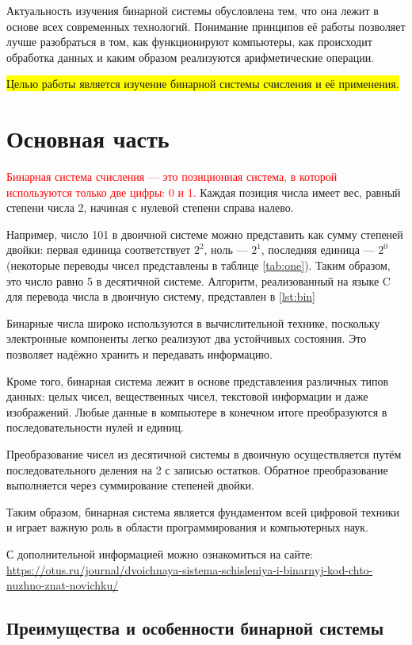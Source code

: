 \documentclass[a4paper, 12pt]{report}
\begin{document}
	Актуальность изучения бинарной системы обусловлена тем, что она лежит в основе всех современных технологий. 
	Понимание принципов её работы позволяет лучше разобраться в том, как функционируют компьютеры, как 
	происходит обработка данных и каким образом реализуются арифметические операции.
	
	\colorbox{yellow}{Целью работы является изучение бинарной системы счисления и её применения.}
	
	\chapter{Основная часть}
	\textcolor{red}{Бинарная система счисления — это позиционная система, в которой используются только две цифры: 0 и 1.}
	Каждая позиция числа имеет вес, равный степени числа 2, начиная с нулевой степени справа налево.
	
	Например, число 101 в двоичной системе можно представить как сумму степеней двойки:
	первая единица соответствует $2^2$, ноль — $2^1$, последняя единица — $2^0$ (некоторые переводы чисел представлены в таблице \ref{tab:one}).
	Таким образом, это число равно 5 в десятичной системе. Алгоритм, реализованный на языке C для перевода числа в двоичную систему, представлен в \ref{lst:bin} 
	
	Бинарные числа широко используются в вычислительной технике, поскольку электронные компоненты 
	легко реализуют два устойчивых состояния. Это позволяет надёжно хранить и передавать информацию.
	
	Кроме того, бинарная система лежит в основе представления различных типов данных: целых чисел, 
	вещественных чисел, текстовой информации и даже изображений. Любые данные в компьютере в конечном 
	итоге преобразуются в последовательности нулей и единиц.
	
	Преобразование чисел из десятичной системы в двоичную осуществляется путём последовательного деления 
	на 2 с записью остатков. Обратное преобразование выполняется через суммирование степеней двойки.
	
	Таким образом, бинарная система является фундаментом всей цифровой техники и играет важную роль 
	в области программирования и компьютерных наук.
	
	С дополнительной информацией можно ознакомиться на сайте:
	\url{https://otus.ru/journal/dvoichnaya-sistema-schisleniya-i-binarnyj-kod-chto-nuzhno-znat-novichku/}
	
	\section{Преимущества и особенности бинарной системы}
	
\end{document}
